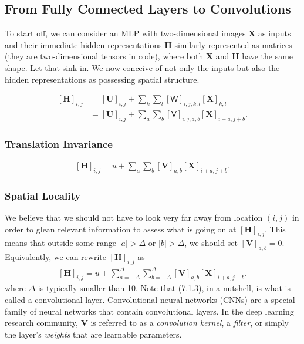 \documentclass[a4paper,12pt]{article}
\theoremstyle{definition}
\begin{document}
    \subsection*{From Fully Connected Layers to Convolutions}

    To start off, we can consider an MLP with two-dimensional images $\mathbf{X}$ as inputs and their immediate hidden representations $\mathbf{H}$  similarly represented 
    as matrices (they are two-dimensional tensors in code), where both $\mathbf{X}$ and $\mathbf{H}$ have the same shape. Let that sink in. We now conceive of not only the 
    inputs but also the hidden representations as possessing spatial structure.


    \begin{equation*}
        \begin{aligned} 
            [\mathbf{H}]_{i, j} &= [\mathbf{U}]_{i, j} + \sum_k \sum_l[\mathsf{W}]_{i, j, k, l}  [\mathbf{X}]_{k, l}\\ &=  [\mathbf{U}]_{i, j} +
            \sum_a \sum_b [\mathsf{V}]_{i, j, a, b}  [\mathbf{X}]_{i+a, j+b}.
        \end{aligned}
    \end{equation*}

    \subsubsection*{Translation Invariance}
    \begin{equation*}
        \begin{aligned}
            [\mathbf{H}]_{i, j} = u + \sum_a\sum_b [\mathbf{V}]_{a, b}  [\mathbf{X}]_{i+a, j+b}.
        \end{aligned}
    \end{equation*}

    \subsubsection*{Spatial Locality}
    We believe that we should not have to look very far away from location $(i, j)$ in order to glean relevant information to assess what is going on at $[\mathbf{H}]_{i, j}$. 
    This means that outside some range $|a|> \Delta$ or $|b| > \Delta$, we should set $[\mathbf{V}]_{a, b} = 0$. Equivalently, we can rewrite $[\mathbf{H}]_{i, j}$ as
    \begin{equation}
        \begin{aligned}
            [\mathbf{H}]_{i, j} = u + \sum_{a = -\Delta}^{\Delta} \sum_{b = -\Delta}^{\Delta} [\mathbf{V}]_{a, b}  [\mathbf{X}]_{i+a, j+b}.
        \end{aligned}
    \end{equation}
    where $\Delta$ is typically smaller than 10. Note that (7.1.3), in a nutshell, is what is called a convolutional layer. Convolutional neural networks (CNNs) are a special 
    family of neural networks that contain convolutional layers. In the deep learning research community, $\mathbf{V}$ is referred to as a \emph{convolution kernel}, a \emph{filter}, 
    or simply the layer's \emph{weights} that are learnable parameters.
\end{document}
